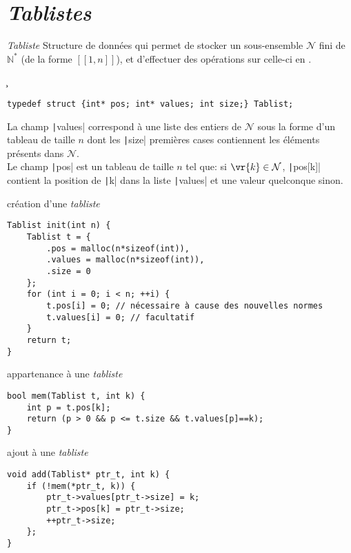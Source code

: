 \section{\emph{Tablistes}}
\begin{df*}{\emph{Tabliste}}
Structure de données qui permet de stocker un sous-ensemble $\mathcal{N}$ fini de $\mathbb{N}^*$ (de la forme $\left[\!\left[1,n\right]\!\right]$), et d'effectuer des opérations sur celle-ci en .
\end{df*}
\c
\begin{tp*}{}
\begin{verbatim}
typedef struct {int* pos; int* values; int size;} Tablist;
\end{verbatim}
La champ \texttt|values| correspond à une liste des entiers de $\mathcal{N}$ sous la forme d'un tableau de taille $n$ dont les \texttt|size| premières cases contiennent les éléments présents dans $\mathcal{N}$.\\Le champ \texttt|pos| est un tableau de taille $n$ tel que: si $\vr{k}\in\mathcal{N}$, \texttt|pos[k]| contient la position de \texttt|k| dans la liste \texttt|values| et une valeur quelconque sinon.
\end{tp*}
\begin{fnc*}{création d'une \emph{tabliste}}
\begin{verbatim}
Tablist init(int n) {
    Tablist t = {
        .pos = malloc(n*sizeof(int)),
        .values = malloc(n*sizeof(int)),
        .size = 0
    };
    for (int i = 0; i < n; ++i) {
        t.pos[i] = 0; // nécessaire à cause des nouvelles normes
        t.values[i] = 0; // facultatif
    }
    return t;
}
\end{verbatim}
\end{fnc*}
\begin{fnc*}{appartenance à une \emph{tabliste}}
\begin{verbatim}
bool mem(Tablist t, int k) {
    int p = t.pos[k];
    return (p > 0 && p <= t.size && t.values[p]==k);
}
\end{verbatim}
\end{fnc*}
\begin{fnc*}{ajout à une \emph{tabliste}}
\begin{verbatim}
void add(Tablist* ptr_t, int k) {
    if (!mem(*ptr_t, k)) {
        ptr_t->values[ptr_t->size] = k;
        ptr_t->pos[k] = ptr_t->size;
        ++ptr_t->size;
    };
}
\end{verbatim}
\end{fnc*}
